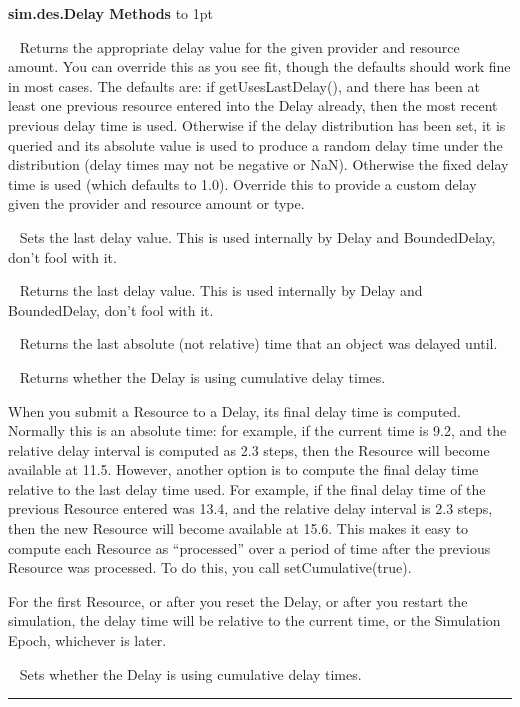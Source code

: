 \documentclass[twoside,10pt]{article}
\newcommand\class[1]{\index{Classes!{#1}}\textsf{#1}}
\newcommand\method[1]{\hbox{\textsf{#1}}}
\newcommand*{\xfill}[1][0pt]{%
	\cleaders
		\hbox to 1pt{\hss
			\raisebox{#1}{\rule{1.2pt}{0.4pt}}%
			\hss}\hfill}
\newenvironment{methods}[1]{
\vspace{1.0em}\noindent\textsf{\textbf{#1 Methods}}\quad \xfill[0.5ex]
\vspace{-0.25em}
\begin{description}
\small}
{\end{description}\hrule\vspace{1.5em}}
\newcommand{\mthd}[1]{\item[{\sf #1}]~\newline}
\begin{document}
\begin{methods}{\class{sim.des.Delay}}
\mthd{protected double getDelay(Provider provider, Resource amount)}
Returns the appropriate delay value for the given provider and resource amount.
    	You can override this as you see fit, though the defaults should work fine in most 
    	cases.  The defaults are: if getUsesLastDelay(), and there has been at least one 
    	previous resource entered into the Delay already, then the most recent previous 
    	delay time is used.  Otherwise if the delay distribution has been set, it is queried
    	and its absolute value is used to produce a random delay time under the distribution
    	(delay times may not be negative or NaN).  Otherwise the fixed delay time is used 
    	(which defaults to 1.0).  Override this to provide a custom delay given the 
        provider and resource amount or type.
        
\mthd{protected void setLastDelay(double val)}
Sets the last delay value.  This is used internally by Delay and BoundedDelay, don't fool with it.

\mthd{protected double getLastDelay()}
Returns the last delay value.  This is used internally by Delay and BoundedDelay, don't fool with it.

\mthd{public double getLastDelayTime()}
Returns the last absolute (not relative) time that an object was delayed until.

\mthd{public boolean isCumulative()}
Returns whether the Delay is using cumulative delay times.

When you submit a Resource to a Delay, its final delay time is computed.  Normally this is an absolute time: for example, if the current time is 9.2, and the relative delay interval is computed as 2.3 steps, then the Resource will become available at 11.5.  However, another option is to compute the final delay time relative to the last delay time used.   For example, if the final delay time of the previous Resource entered was 13.4, and the relative delay interval is 2.3 steps, then the new Resource will become available at 15.6.  This makes it easy to compute each Resource as ``processed'' over a period of time after the previous Resource was processed.  To do this, you call \method{setCumulative(true)}.  

For the first Resource, or after you reset the Delay, or after you restart
	the simulation, the delay time will be relative to the current time, or the
	Simulation Epoch, whichever is later.

\mthd{public void setCumulative(boolean val)}
Sets whether the Delay is using cumulative delay times.


\end{methods}
\end{document}
